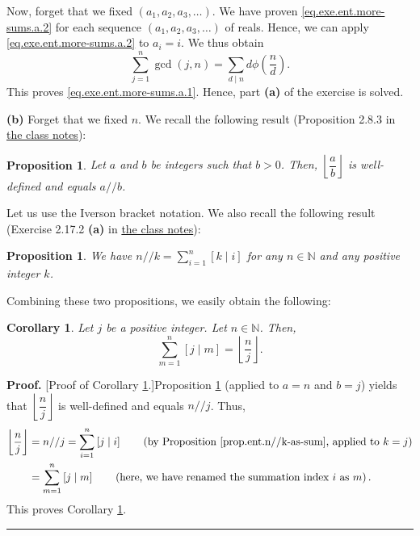 \documentclass[paper=a4, fontsize=12pt]{scrartcl}%
\let\sumnonlimits\sum
\renewcommand{\sum}{\sumnonlimits\limits}
\theoremstyle{plainsl}
\newtheorem{proposition}[theorem]{Proposition}
\newtheorem{corollary}[theorem]{Corollary}
\theoremstyle{definition}
\theoremstyle{remark}
\newenvironment{proof}[1][Proof]{\noindent\textbf{#1.} }{\ \rule{0.5em}{0.5em}}
\begin{document}
Now, forget that we fixed $\left(  a_{1},a_{2},a_{3},\ldots\right)  $. We have
proven \eqref{eq.exe.ent.more-sums.a.2} for each sequence $\left(  a_{1}%
,a_{2},a_{3},\ldots\right)  $ of reals. Hence, we can apply
\eqref{eq.exe.ent.more-sums.a.2} to $a_{i}=i$. We thus obtain%
\[
\sum_{j=1}^{n}\gcd\left(  j,n\right)  =\sum_{d\mid n}d\phi\left(  \dfrac{n}%
{d}\right)  .
\]
This proves \eqref{eq.exe.ent.more-sums.a.1}. Hence, part \textbf{(a)} of the
exercise is solved.

\bigskip

\textbf{(b)} Forget that we fixed $n$. We recall the following result
(Proposition 2.8.3 in
\href{http://www.cip.ifi.lmu.de/~grinberg/t/19s/notes.pdf}{the class notes}):

\begin{proposition}
\label{prop.ent.floor.quorem}Let $a$ and $b$ be integers such that $b>0$.
Then, $\left\lfloor \dfrac{a}{b}\right\rfloor $ is well-defined and equals
$a//b$.
\end{proposition}

Let us use the Iverson bracket notation. We also recall the following result
(Exercise 2.17.2 \textbf{(a)} in
\href{http://www.cip.ifi.lmu.de/~grinberg/t/19s/notes.pdf}{the class notes}):

\begin{proposition}
\label{prop.ent.n//k-as-sum}We have $n//k=\sum_{i=1}^{n}\left[  k\mid
i\right]  $ for any $n\in\mathbb{N}$ and any positive integer $k$.
\end{proposition}

Combining these two propositions, we easily obtain the following:

\begin{corollary}
\label{cor.ent.floor-mj-as-sum}Let $j$ be a positive integer. Let
$n\in\mathbb{N}$. Then,%
\[
\sum_{m=1}^{n}\left[  j\mid m\right]  =\left\lfloor \dfrac{n}{j}\right\rfloor
.
\]

\end{corollary}

\begin{proof}
[Proof of Corollary \ref{cor.ent.floor-mj-as-sum}.]Proposition
\ref{prop.ent.floor.quorem} (applied to $a=n$ and $b=j$) yields that
$\left\lfloor \dfrac{n}{j}\right\rfloor $ is well-defined and equals $n//j$.
Thus,
\begin{align*}
\left\lfloor \dfrac{n}{j}\right\rfloor  &  =n//j=\sum_{i=1}^{n}\left[  j\mid
i\right]  \qquad\left(  \text{by Proposition \ref{prop.ent.n//k-as-sum},
applied to }k=j\right) \\
&  =\sum_{m=1}^{n}\left[  j\mid m\right]  \qquad\left(  \text{here, we have
renamed the summation index }i\text{ as }m\right)  .
\end{align*}
This proves Corollary \ref{cor.ent.floor-mj-as-sum}.
\end{proof}
\end{document}
